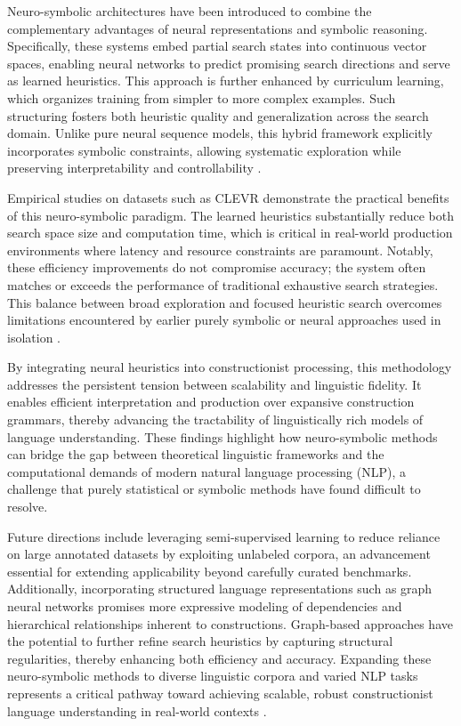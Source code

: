 Neuro-symbolic architectures have been introduced to combine the complementary advantages of neural representations and symbolic reasoning. Specifically, these systems embed partial search states into continuous vector spaces, enabling neural networks to predict promising search directions and serve as learned heuristics. This approach is further enhanced by curriculum learning, which organizes training from simpler to more complex examples. Such structuring fosters both heuristic quality and generalization across the search domain. Unlike pure neural sequence models, this hybrid framework explicitly incorporates symbolic constraints, allowing systematic exploration while preserving interpretability and controllability \cite{ref40}.

Empirical studies on datasets such as CLEVR demonstrate the practical benefits of this neuro-symbolic paradigm. The learned heuristics substantially reduce both search space size and computation time, which is critical in real-world production environments where latency and resource constraints are paramount. Notably, these efficiency improvements do not compromise accuracy; the system often matches or exceeds the performance of traditional exhaustive search strategies. This balance between broad exploration and focused heuristic search overcomes limitations encountered by earlier purely symbolic or neural approaches used in isolation \cite{ref40}.

By integrating neural heuristics into constructionist processing, this methodology addresses the persistent tension between scalability and linguistic fidelity. It enables efficient interpretation and production over expansive construction grammars, thereby advancing the tractability of linguistically rich models of language understanding. These findings highlight how neuro-symbolic methods can bridge the gap between theoretical linguistic frameworks and the computational demands of modern natural language processing (NLP), a challenge that purely statistical or symbolic methods have found difficult to resolve.

Future directions include leveraging semi-supervised learning to reduce reliance on large annotated datasets by exploiting unlabeled corpora, an advancement essential for extending applicability beyond carefully curated benchmarks. Additionally, incorporating structured language representations such as graph neural networks promises more expressive modeling of dependencies and hierarchical relationships inherent to constructions. Graph-based approaches have the potential to further refine search heuristics by capturing structural regularities, thereby enhancing both efficiency and accuracy. Expanding these neuro-symbolic methods to diverse linguistic corpora and varied NLP tasks represents a critical pathway toward achieving scalable, robust constructionist language understanding in real-world contexts \cite{ref40}.

